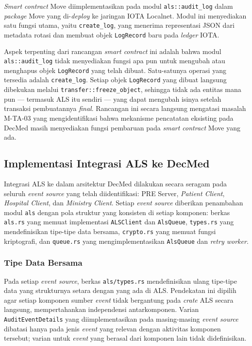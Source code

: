 \textit{Smart contract} Move diimplementasikan pada modul
\texttt{als::audit\_log} dalam \textit{package} Move yang di-\textit{deploy} ke
jaringan IOTA Localnet. Modul ini menyediakan satu fungsi utama, yaitu
\texttt{create\_log}, yang menerima representasi JSON dari metadata rotasi dan
membuat objek \texttt{LogRecord} baru pada \textit{ledger} IOTA.

Aspek terpenting dari rancangan \textit{smart contract} ini adalah bahwa modul
\texttt{als::audit\_log} tidak menyediakan fungsi apa pun untuk mengubah atau
menghapus objek \texttt{LogRecord} yang telah dibuat. Satu-satunya operasi yang
tersedia adalah \texttt{create\_log}. Setiap objek \texttt{LogRecord} yang dibuat
langsung dibekukan melalui \texttt{transfer::freeze\_object}, sehingga tidak ada
entitas mana pun --- termasuk ALS itu sendiri --- yang dapat mengubah isinya
setelah transaksi pembuatannya \textit{final}. Rancangan ini secara langsung
mengatasi masalah M-TA-03 yang mengidentifikasi bahwa mekanisme pencatatan
eksisting pada DecMed masih menyediakan fungsi pembaruan pada \textit{smart
contract} Move yang ada.

\subsection{Implementasi Integrasi ALS ke DecMed}

Integrasi ALS ke dalam arsitektur DecMed dilakukan secara seragam pada seluruh
\textit{event source} yang telah diidentifikasi: PRE Server, \textit{Patient
Client}, \textit{Hospital Client}, dan \textit{Ministry Client}. Setiap
\textit{event source} diberikan penambahan modul \texttt{als} dengan pola
struktur yang konsisten di setiap komponen: berkas \texttt{als.rs} yang memuat
implementasi \texttt{ALSClient} dan \texttt{AlsQueue}, \texttt{types.rs} yang
mendefinisikan tipe-tipe data bersama, \texttt{crypto.rs} yang memuat fungsi
kriptografi, dan \texttt{queue.rs} yang mengimplementasikan \texttt{AlsQueue}
dan \textit{retry worker}.

\subsubsection{Tipe Data Bersama}

Pada setiap \textit{event source}, berkas \texttt{als/types.rs} mendefinisikan
ulang tipe-tipe data yang strukturnya setara dengan yang ada di ALS. Pendekatan
ini dipilih agar setiap komponen sumber \textit{event} tidak bergantung pada
\textit{crate} ALS secara langsung, mempertahankan independensi antarkomponen.
Varian \texttt{AuditEventDetails} yang diimplementasikan pada masing-masing
\textit{event source} dibatasi hanya pada jenis \textit{event} yang relevan
dengan aktivitas komponen tersebut; varian untuk \textit{event} yang berasal
dari komponen lain tidak didefinisikan.

